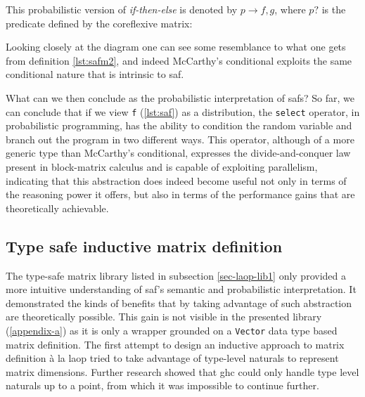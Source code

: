 \documentclass[
  oneside,
  11pt, a4paper,
  footinclude=true,
  headinclude=true,
  cleardoublepage=empty
]{scrbook}
\theoremstyle{definition}
\theoremstyle{definition}
\begin{document}
        \begin{center}\label{dig-mccarthy}
        \end{center}{}
        
        This probabilistic version of \emph{if-then-else} is denoted by $p \rightarrow f,g$, where $p?$ is the predicate defined by the coreflexive matrix:
        
        \begin{center}
        \end{center}{}
        
        Looking closely at the diagram one can see some resemblance to what one gets from definition \ref{lst:safm2}, and indeed McCarthy's conditional exploits the same conditional nature that is intrinsic to \gls{saf}.
        
        What can we then conclude as the probabilistic interpretation of \glspl{saf}? So far, we can conclude that if we view \texttt{f} (\ref{lst:saf}) as a distribution, the \texttt {select} operator, in probabilistic programming, has the ability to condition the random variable and branch out the program in two different ways. This operator, although of a more generic type than McCarthy's conditional, expresses the divide-and-conquer law present in block-matrix calculus and is capable of exploiting parallelism, indicating that this abstraction does indeed become useful not only in terms of the reasoning power it offers, but also in terms of the performance gains that are theoretically achievable.
        
	    \subsection{Type safe inductive matrix definition}
	    
        The type-safe matrix library listed in subsection \ref{sec-laop-lib1} only provided a more intuitive understanding of \gls{saf}'s semantic and probabilistic interpretation. It demonstrated the kinds of benefits that by taking advantage of such abstraction are theoretically possible. This gain is not visible in the presented library (\ref{appendix-a}) as it is only a wrapper grounded on a \texttt{Vector} data type based matrix definition. The first attempt to design an inductive approach to matrix definition à la \gls{laop} tried to take advantage of type-level naturals to represent matrix dimensions. Further research showed that \gls{ghc} could only handle type level naturals up to a point, from which it was impossible to continue further.
	    
\end{document}

